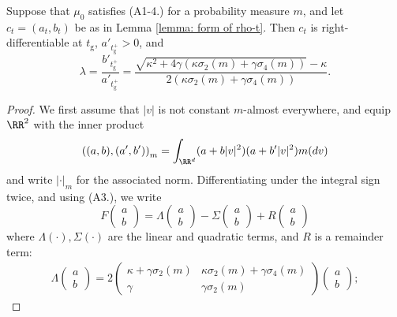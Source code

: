 \begin{lemma}\label{lemma: BNCP} Suppose that $\mu_0$ satisfies (A1-4.) for a probability measure $m$, and let $c_t=(a_t, b_t)$ be as in Lemma \ref{lemma: form of rho-t}.  Then $c_t$ is right-differentiable at $t_\mathrm{g}$, $a'_{t_\mathrm{g}^+}>0$, and \begin{equation}\label{eq: ratio of r derivatives} \lambda = \frac{b'_{t_\mathrm{g}^+}}{a'_{t_\mathrm{g}^+}}=\frac{\sqrt{\kappa^2+4\gamma(\kappa\sigma_2(m)+\gamma \sigma_4(m))}-\kappa}{2(\kappa\sigma_2(m)+\gamma\sigma_4(m))}. \end{equation}  \end{lemma} \begin{proof} We first assume that $|v|$ is not constant $m$-almost everywhere, and equip $\RR^2$ with the inner product \begin{equation} \left((a,b),(a',b')\right)_m=\int_{\RR^d} (a+b|v|^2)(a+b'|v|^2)m(dv)  \end{equation} and write $|\cdot|_m$ for the associated norm.  Differentiating under the integral sign twice, and using (A3.), we write \begin{equation} F\left(\begin{matrix} a \\ b \end{matrix}\right) = \Lambda\left(\begin{matrix} a \\ b \end{matrix}\right)-\Sigma \left(\begin{matrix} a \\ b \end{matrix}\right) + R\left(\begin{matrix} a \\ b \end{matrix}\right) \end{equation} where $\Lambda(\cdot), \Sigma(\cdot)$ are the linear and quadratic terms, and $R$ is a remainder term:   \begin{gather} \label{eq: defn of L}
    \Lambda\left(\begin{matrix} a \\ b \end{matrix}\right)=2\left(\begin{matrix} \kappa+\gamma\sigma_2(m) & \kappa \sigma_2(m)+\gamma\sigma_4(m)\\ \gamma & \gamma \sigma_2(m) \end{matrix}\right)\left(\begin{matrix} a \\ b \end{matrix}\right);

\end{gather}
\end{proof}
